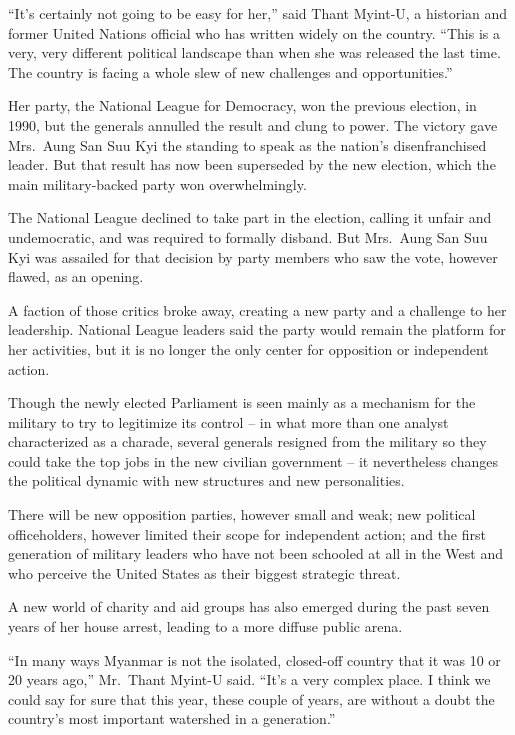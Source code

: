 ﻿\documentclass[12pt]{article}
\begin{document}
``It's certainly not going to be easy for her,'' said Thant Myint-U, a historian and former United
Nations official who has written widely on the country. ``This is a very, very different political
landscape than when she was released the last time. The country is facing a whole slew of new
challenges and opportunities.''

Her party, the National League for Democracy, won the previous election, in 1990, but the generals
annulled the result and clung to power. The victory gave Mrs.~Aung San Suu Kyi the standing to speak
as the nation's disenfranchised leader. But that result has now been superseded by the new election,
which the main military-backed party won overwhelmingly.

The National League declined to take part in the election, calling it unfair and undemocratic, and
was required to formally disband. But Mrs.~Aung San Suu Kyi was assailed for that decision by party
members who saw the vote, however flawed, as an opening.

A faction of those critics broke away, creating a new party and a challenge to her leadership.
National League leaders said the party would remain the platform for her activities, but it is no
longer the only center for opposition or independent action.

Though the newly elected Parliament is seen mainly as a mechanism for the military to try to
legitimize its control -- in what more than one analyst characterized as a charade, several generals
resigned from the military so they could take the top jobs in the new civilian government -- it
nevertheless changes the political dynamic with new structures and new personalities.

There will be new opposition parties, however small and weak; new political officeholders, however
limited their scope for independent action; and the first generation of military leaders who have
not been schooled at all in the West and who perceive the United States as their biggest strategic
threat.

A new world of charity and aid groups has also emerged during the past seven years of her house
arrest, leading to a more diffuse public arena.

``In many ways Myanmar is not the isolated, closed-off country that it was 10 or 20 years ago,''
Mr.~Thant Myint-U said. ``It's a very complex place. I think we could say for sure that this year,
these couple of years, are without a doubt the country's most important watershed in a generation.''
\end{document}
